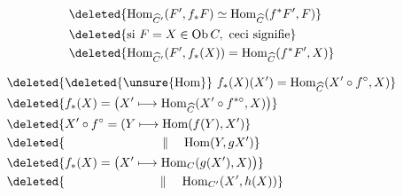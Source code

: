 \[\begin{aligned}&\deleted{\operatorname{Hom}_{\widehat C'}(F',f_*F)\simeq\operatorname{Hom}_{\widehat C}(f^*F',F)}\\&\deleted{\text{si }F=X\in\mathrm{Ob}\,C,\ \text{ceci signifie}}\\&\deleted{\operatorname{Hom}_{\widehat C'}(F',f_*(X))=\operatorname{Hom}_{\widehat C}(f^*F',X)}\end{aligned}\]


\[\begin{aligned}&\deleted{\deleted{\unsure{\operatorname{Hom}}}\ f_*(X)(X')=\operatorname{Hom}_{\widehat C}(X'\circ f^{\circ},X)}\\&\deleted{f_*(X)=\bigl(X'\longmapsto\operatorname{Hom}_{\widehat C}(X'\circ f^{*\circ},X)\bigr)}\\&\deleted{X'\circ f^\circ=(Y\longmapsto\operatorname{Hom}(f(Y),X')}\\&\deleted{\hphantom{X'\circ f^\circ=(Y\longmapsto}\parallel\quad\operatorname{Hom}(Y,gX')}\\&\deleted{f_*(X)=\bigl(X'\longmapsto\operatorname{Hom}_C(g(X'),X)\bigr)}\\&\deleted{\hphantom{f_*(X)=(X'\longmapsto}\parallel\quad\operatorname{Hom}_{C'}(X',h(X))}\end{aligned}\]
